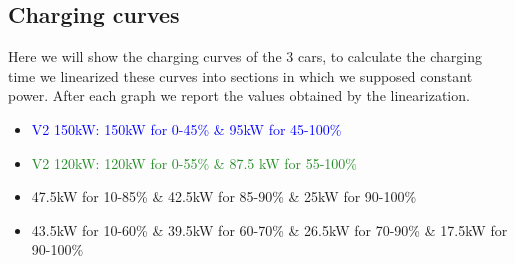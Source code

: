 \documentclass{article}
\begin{document}
\subsection{Charging curves}
Here we will show the charging curves of the 3 cars, to calculate the charging time we linearized these curves into sections in which we supposed constant power. After each graph we report the values obtained by the linearization.
\begin{figure}[H]
\end{figure}
\begin{itemize}
\item \textcolor{blue}{V2 150kW: 150kW for 0-45\% \& 95kW for 45-100\%}
\item \textcolor{ForestGreen}{V2 120kW: 120kW for 0-55\% \& 87.5 kW for 55-100\%}
\end{itemize}
\begin{figure}[H]
\end{figure}
\begin{itemize}
\color{orange}
\item 47.5kW for 10-85\% \& 42.5kW for 85-90\% \& 25kW for 90-100\%
\end{itemize}
\begin{figure}[H]
\end{figure}
\begin{itemize}
\color{orange}
\item 43.5kW for 10-60\% \& 39.5kW for 60-70\% \& 26.5kW for 70-90\% \& 17.5kW for 90-100\%
\end{itemize}
\end{document}
